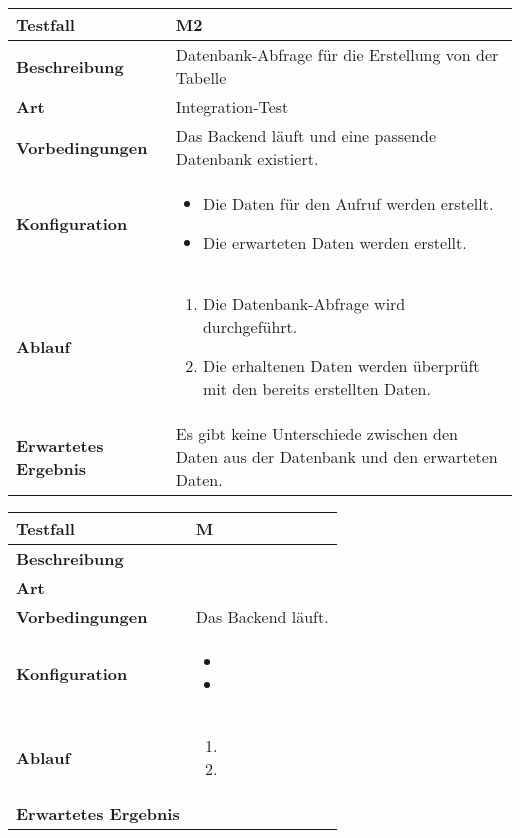 \begin{longtable}{p{}|p{}}
	\hline
	\textbf{Testfall}               & \textbf{M2} \\
	\hline
	\textbf{Beschreibung}   		& Datenbank-Abfrage für die Erstellung von der Tabelle \\
	\hline
	\textbf{Art}    				& Integration-Test \\
	\hline
	\textbf{Vorbedingungen}    		& Das Backend läuft und eine passende Datenbank existiert. \\
	\hline
	\textbf{Konfiguration}   	 	& 
	\begin{itemize}
		\item Die Daten für den Aufruf werden erstellt.
		\item Die erwarteten Daten werden erstellt.
	\end{itemize} \\
	\hline
	\textbf{Ablauf}    				& 
	\begin{enumerate}
		\item Die Datenbank-Abfrage wird durchgeführt.
		\item Die erhaltenen Daten werden überprüft mit den bereits erstellten Daten.
	\end{enumerate} \\
	\hline
	\textbf{Erwartetes Ergebnis}    & Es gibt keine Unterschiede zwischen den Daten aus der Datenbank und den erwarteten Daten.  \\
	\hline
\end{longtable}\label{tab:testfall-M2}

\begin{longtable}{p{}|p{}}
	\hline
	\textbf{Testfall}               & \textbf{M} \\
	\hline
	\textbf{Beschreibung}   		&  \\
	\hline
	\textbf{Art}    				&  \\
	\hline
	\textbf{Vorbedingungen}    		& Das Backend läuft. \\
	\hline
	\textbf{Konfiguration}   	 	& 
	\begin{itemize}
		\item 
		\item 
	\end{itemize} \\
	\hline
	\textbf{Ablauf}    				& 
	\begin{enumerate}
		\item 
		\item 
	\end{enumerate} \\
	\hline
	\textbf{Erwartetes Ergebnis}    &  \\
	\hline
\end{longtable}\label{tab:testfall-M}

\newpage